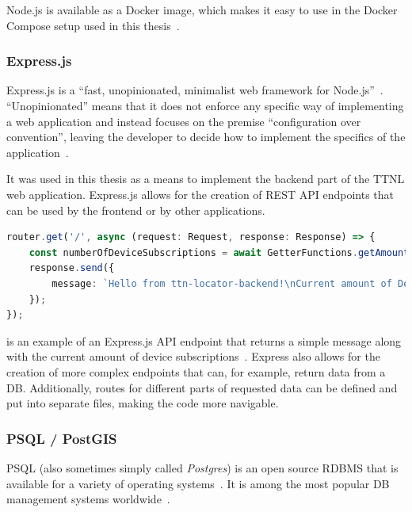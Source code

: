 Node.js is available as a Docker image, which makes it easy to use in the Docker Compose setup used in this thesis~\cite{docker_inc_node_2023}.

\subsubsection{Express.js}

Express.js is a ``fast, unopinionated, minimalist web framework for Node.js''~\cite{openjs_foundation_express_nodate}.
``Unopinionated'' means that it does not enforce any specific way of implementing a web application and instead focuses on the premise ``configuration over convention'', leaving the developer to decide how to implement the specifics of the application~\cite{mardan_pro_2014}.

It was used in this thesis as a means to implement the backend part of the \ac{TTNL} web application.
Express.js allows for the creation of \ac{REST} \ac{API} endpoints that can be used by the frontend or by other applications.

\begin{lstlisting}[language=TypeScript, float, caption={Example of an Express.js \ac{API} endpoint}, label={lst:express-api-endpoint}]
router.get('/', async (request: Request, response: Response) => {
    const numberOfDeviceSubscriptions = await GetterFunctions.getAmountOfDeviceSubscriptions();
    response.send({
        message: `Hello from ttn-locator-backend!\nCurrent amount of Device subscriptions: ${numberOfDeviceSubscriptions}`,
    });
});
\end{lstlisting}

 is an example of an Express.js \ac{API} endpoint that returns a simple message along with the current amount of device subscriptions~\cite{openjs_foundation_express_routing}.
Express also allows for the creation of more complex endpoints that can, for example, return data from a \ac{DB}.
Additionally, routes for different parts of requested data can be defined and put into separate files, making the code more navigable.

\subsubsection{\acf{PSQL} / PostGIS}

\acl{PSQL} (also sometimes simply called \emph{Postgres}) is an open source \ac{RDBMS} that is available for a variety of operating systems~\cite{postgresql_global_development_group_postgresql_2023}.
It is among the most popular \ac{DB} management systems worldwide~\cite{db-engines_most_2023}.

